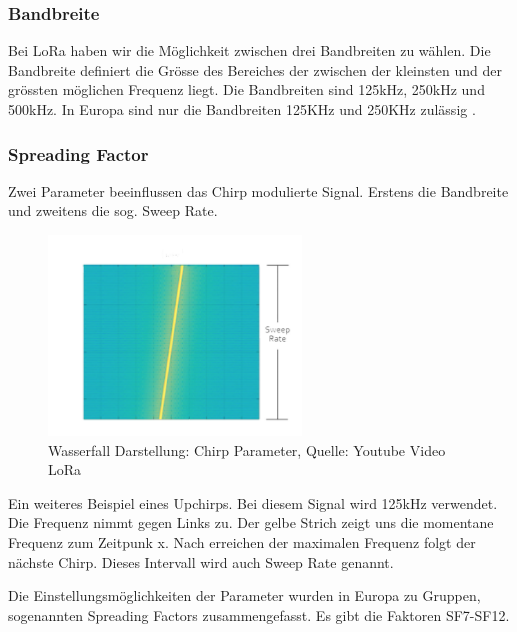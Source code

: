 \documentclass[11pt,english,german]{report}
\theoremstyle{definition}
\begin{document}
\subsubsection{Bandbreite}
Bei LoRa haben wir die Möglichkeit zwischen drei Bandbreiten zu wählen. Die Bandbreite definiert die Grösse des Bereiches der zwischen der kleinsten und der grössten möglichen Frequenz liegt. Die Bandbreiten sind 125kHz, 250kHz und 500kHz. In Europa sind nur die Bandbreiten 125KHz und 250KHz zulässig \cite{lorabandwitdh}. 

\newpage
\subsubsection{Spreading Factor}
Zwei Parameter beeinflussen das Chirp modulierte Signal. Erstens die Bandbreite und zweitens die sog. Sweep Rate.

\begin{figure}[H]
	\centering
	\includegraphics[width=0.6\textwidth]{img/lora/chirp.jpg}
	\caption[Wasserfall Darstellung: Chirp Parameter]
	{Wasserfall Darstellung: Chirp Parameter, Quelle: Youtube Video LoRa \cite{lorabandwidth}}
\end{figure}

\noindent
Ein weiteres Beispiel eines Upchirps. Bei diesem Signal wird 125kHz verwendet. Die Frequenz nimmt gegen Links zu. Der gelbe Strich zeigt uns die momentane Frequenz zum Zeitpunk x. Nach erreichen der maximalen Frequenz folgt der nächste Chirp. Dieses Intervall wird auch Sweep Rate genannt.

\newpage
\noindent
Die Einstellungsmöglichkeiten der Parameter wurden in Europa zu Gruppen, sogenannten Spreading Factors zusammengefasst. Es gibt die Faktoren SF7-SF12.
\end{document}
